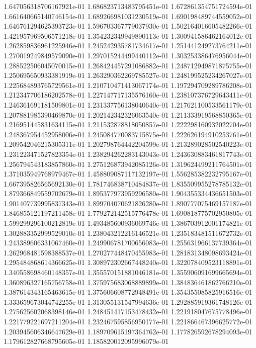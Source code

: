 1.647056318706167921e-01
1.686823713483795451e-01
1.672861354751724594e-01
1.661640665140746154e-01
1.689266981031230519e-01
1.690198489744559052e-01
1.646761294625393723e-01
1.596703367779037930e-01
1.502164016605482266e-01
1.421957969506571218e-01
1.354232349949890113e-01
1.300941586462164012e-01
1.262859836961225946e-01
1.245242935781734617e-01
1.251441249273764211e-01
1.270019249849579090e-01
1.297015244499440112e-01
1.303253386476956044e-01
1.288522506045070015e-01
1.268424457291086882e-01
1.248712949871875755e-01
1.250695650933381919e-01
1.263290362269785527e-01
1.248199525234267027e-01
1.225684893765729561e-01
1.210710471413067174e-01
1.197294709289786208e-01
1.212347706186202578e-01
1.227147717135576160e-01
1.238107376729643411e-01
1.246361691181509801e-01
1.231337756138040640e-01
1.217621100533561179e-01
1.207881985390469870e-01
1.202142342326063540e-01
1.211333919568850365e-01
1.216951445831634115e-01
1.211532878818050857e-01
1.222298160932022704e-01
1.248367954452958006e-01
1.245084770083715875e-01
1.222626194910253761e-01
1.209542046215305311e-01
1.202798764442204599e-01
1.213289028502540223e-01
1.231223471527823354e-01
1.238294262283143043e-01
1.243630883461817743e-01
1.256794543183857860e-01
1.275126873942085126e-01
1.319624499211764501e-01
1.371035949768979467e-01
1.458809087117132197e-01
1.556285382232795167e-01
1.667395826565692130e-01
1.781746838710484837e-01
1.835509955278785132e-01
1.879366849559702679e-01
1.895377973959296580e-01
1.904355334436651503e-01
1.901407739995837343e-01
1.899704070621826280e-01
1.890777075469157187e-01
1.846855121197211458e-01
1.779272142515776478e-01
1.690818775702950805e-01
1.599299296100212819e-01
1.493485600936069746e-01
1.386703912001174821e-01
1.302883352999529010e-01
1.238043212216146521e-01
1.235183481511672732e-01
1.243389606331067460e-01
1.249906781700656083e-01
1.255631966137739364e-01
1.262968481598388537e-01
1.270277448470455983e-01
1.281831348098693424e-01
1.295484868614366625e-01
1.308972302667448240e-01
1.322078409523118891e-01
1.340558698460148357e-01
1.355570151881046181e-01
1.355906091699665694e-01
1.360896327165756758e-01
1.375975683068889899e-01
1.384836461862766210e-01
1.387614343165463615e-01
1.375606608772948491e-01
1.354355085825916516e-01
1.333659673044742255e-01
1.313055131547994636e-01
1.292885919361748126e-01
1.275625602068398146e-01
1.248451417153478432e-01
1.221918047675778496e-01
1.221779221697211204e-01
1.232467595856950177e-01
1.221866467396625772e-01
1.203945606346647629e-01
1.189709615197364762e-01
1.177826592678294093e-01
1.179612827668795605e-01
1.185820012095996079e-01
